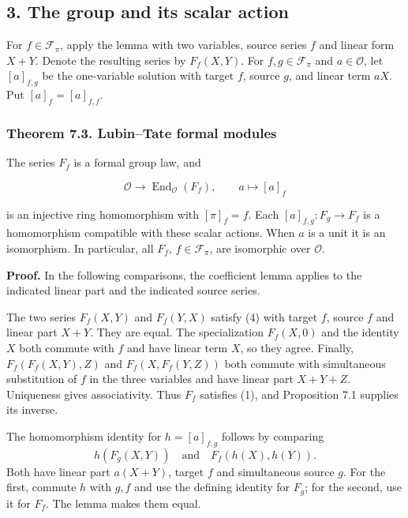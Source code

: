 \documentclass[11pt,a4paper]{article}
\begin{document}
\subsection{3. The group and its scalar
action}\label{the-group-and-its-scalar-action}

For \(f\in\mathcal F_\pi\), apply the lemma with two variables, source
series \(f\) and linear form \(X+Y\). Denote the resulting series by
\(F_f(X,Y)\). For \(f,g\in\mathcal F_\pi\) and \(a\in\mathcal O\), let
\([a]_{f,g}\) be the one-variable solution with target \(f\), source
\(g\), and linear term \(aX\). Put \([a]_f=[a]_{f,f}\).

\subsubsection{Theorem 7.3. Lubin--Tate formal
modules}\label{theorem-7.3.-lubintate-formal-modules}

The series \(F_f\) is a formal group law, and

\[
\mathcal O\longrightarrow\operatorname{End}_{\mathcal O}(F_f),
\qquad a\longmapsto[a]_f
\tag{6}
\]

is an injective ring homomorphism with \([\pi]_f=f\). Each
\([a]_{f,g}:F_g\to F_f\) is a homomorphism compatible with these scalar
actions. When \(a\) is a unit it is an isomorphism. In particular, all
\(F_f\), \(f\in\mathcal F_\pi\), are isomorphic over \(\mathcal O\).

\textbf{Proof.} In the following comparisons, the coefficient lemma
applies to the indicated linear part and the indicated source series.

The two series \(F_f(X,Y)\) and \(F_f(Y,X)\) satisfy (4) with target
\(f\), source \(f\) and linear part \(X+Y\). They are equal. The
specialization \(F_f(X,0)\) and the identity \(X\) both commute with
\(f\) and have linear term \(X\), so they agree. Finally,
\(F_f(F_f(X,Y),Z)\) and \(F_f(X,F_f(Y,Z))\) both commute with
simultaneous substitution of \(f\) in the three variables and have
linear part \(X+Y+Z\). Uniqueness gives associativity. Thus \(F_f\)
satisfies (1), and Proposition 7.1 supplies its inverse.

The homomorphism identity for \(h=[a]_{f,g}\) follows by comparing \[
h(F_g(X,Y))\quad\text{and}\quad F_f(h(X),h(Y)).
\] Both have linear part \(a(X+Y)\), target \(f\) and simultaneous
source \(g\). For the first, commute \(h\) with \(g,f\) and use the
defining identity for \(F_g\); for the second, use it for \(F_f\). The
lemma makes them equal.
\end{document}
